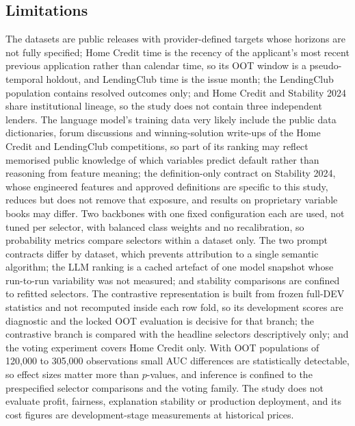 \documentclass[final,5p,twocolumn]{elsarticle}
\begin{document}
\subsection{Limitations}
\label{subsec:limitations}

The datasets are public releases with provider-defined targets whose horizons are not fully specified; Home Credit time is the recency of the applicant's most recent previous application rather than calendar time, so its OOT window is a pseudo-temporal holdout, and LendingClub time is the issue month; the LendingClub population contains resolved outcomes only; and Home Credit and Stability 2024 share institutional lineage, so the study does not contain three independent lenders. The language model's training data very likely include the public data dictionaries, forum discussions and winning-solution write-ups of the Home Credit and LendingClub competitions, so part of its ranking may reflect memorised public knowledge of which variables predict default rather than reasoning from feature meaning; the definition-only contract on Stability 2024, whose engineered features and approved definitions are specific to this study, reduces but does not remove that exposure, and results on proprietary variable books may differ. Two backbones with one fixed configuration each are used, not tuned per selector, with balanced class weights and no recalibration, so probability metrics compare selectors within a dataset only. The two prompt contracts differ by dataset, which prevents attribution to a single semantic algorithm; the LLM ranking is a cached artefact of one model snapshot whose run-to-run variability was not measured; and stability comparisons are confined to refitted selectors. The contrastive representation is built from frozen full-DEV statistics and not recomputed inside each row fold, so its development scores are diagnostic and the locked OOT evaluation is decisive for that branch; the contrastive branch is compared with the headline selectors descriptively only; and the voting experiment covers Home Credit only. With OOT populations of 120,000 to 305,000 observations small AUC differences are statistically detectable, so effect sizes matter more than $p$-values, and inference is confined to the prespecified selector comparisons and the voting family. The study does not evaluate profit, fairness, explanation stability or production deployment, and its cost figures are development-stage measurements at historical prices.

\end{document}
